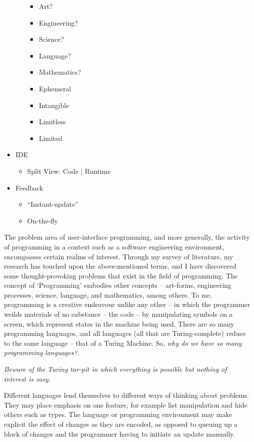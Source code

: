 \documentclass[11pt,openright,a4paper]{report}
\begin{document}
\begin{itemize}
\begin{itemize}
		\begin{itemize}
			\item Art?
			\item Engineering?
			\item Science?
			\item Language?
			\item Mathematics?
			\item Ephemeral
			\item Intangible
			\item Limitless
			\item Limited
		\end{itemize}
	\end{itemize}
	\item IDE
	\begin{itemize}
		\item Split View: Code | Runtime
	\end{itemize}
	\item Feedback
	\begin{itemize}
		\item ``Instant-update''
		\item On-the-fly
	\end{itemize}
\end{itemize}

The problem area of user-interface programming, and more generally, the activity
of programming in a context such as a software engineering environment,
encompasses certain realms of interest. Through my survey of literature, my
research has
touched upon the above-mentioned terms, and I have discovered some thought-provoking
problems that exist in the field of programming. The concept of `Programming'
embodies other concepts -- art-forms, engineering processes, 
science, language, and mathematics, among others. To me, programming is a
creative endeavour unlike any other -- in which the programmer weilds materials
of no substance -- the code -- by manipulating symbols on a screen, which
represent states in the machine being used. There are so many programming
languages, and all languages (all that are Turing-complete) reduce to the same
language -- that of a Turing Machine. So, \textit{why do we have so many
programming languages?}. 

\textit{Beware of the Turing tar-pit in which everything is possible but nothing of
interest is easy.} \cite{PerlisTuringTarpit}

Different languages lend themselves to different ways of
thinking about problems. They may place emphasis on one feature, for example
list manipulation and hide others such as types. The language or programming
environment may make explicit the
effect of changes as they are encoded, as opposed to queuing up a block of
changes and the programmer having to initiate an update manually.
\end{document}
